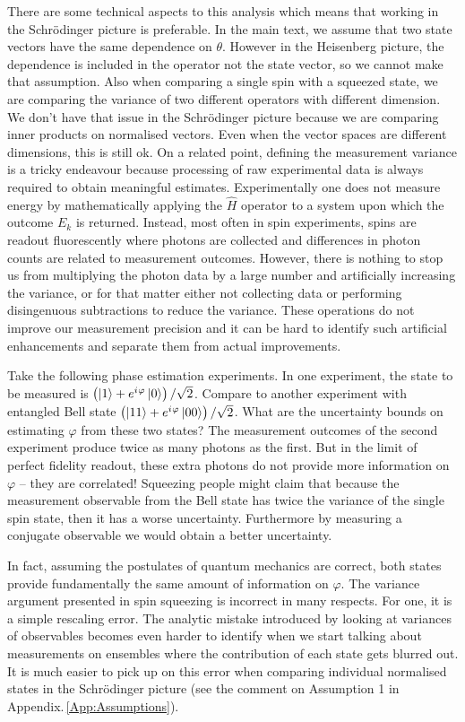 \documentclass[reqno]{amsart}
\newcommand{\ket}[1]{\left| #1 \right>}
\newcommand{\hham}{\hat{H}}
\newcommand{\iu}{{i\mkern1mu}}
\begin{document}
There are some technical aspects to this analysis which means that working in the Schr\"odinger picture is preferable. In the main text, we assume that two state vectors have the same dependence on $\theta$. However in the Heisenberg picture, the dependence is included in the operator not the state vector, so we cannot make that assumption. Also when comparing a single spin with a squeezed state, we are comparing the variance of two different operators with different dimension. We don't have that issue in the Schr\"odinger picture because we are comparing inner products on normalised vectors. Even when the vector spaces are different dimensions, this is still ok. On a related point, defining the measurement variance is a tricky endeavour because processing of raw experimental data is always required to obtain meaningful estimates. Experimentally one does not measure energy by mathematically applying the $\hham$ operator to a system upon which the outcome $E_k$ is returned. Instead, most often in spin experiments, spins are readout fluorescently where photons are collected and differences in photon counts are related to measurement outcomes. However, there is nothing to stop us from multiplying the photon data by a large number and artificially increasing the variance, or for that matter either not collecting data or performing disingenuous subtractions to reduce the variance. These operations do not improve our measurement precision and it can be hard to identify such artificial enhancements and separate them from actual improvements. 

Take the following phase estimation experiments. In one experiment, the state to be measured is $\left(\ket{1} + e^{\iu \varphi}\ket{0}\right)/\sqrt{2}$. Compare to another experiment with entangled Bell state $\left(\ket{1 1}+ e^{\iu \varphi}\ket{0 0}\right)/\sqrt{2}$. What are the uncertainty bounds on estimating $\varphi$ from these two states? The measurement outcomes of the second experiment produce twice as many photons as the first. But in the limit of perfect fidelity readout, these extra photons do not provide more information on $\varphi$ -- they are correlated! Squeezing people might claim that because the measurement observable from the Bell state has twice the variance of the single spin state, then it has a worse uncertainty. Furthermore by measuring a conjugate observable we would obtain a better uncertainty.

In fact, assuming the postulates of quantum mechanics are correct, both states provide fundamentally the same amount of information on $\varphi$. The variance argument presented in spin squeezing is incorrect in many respects. For one, it is a simple rescaling error. The analytic mistake introduced by looking at variances of observables becomes even harder to identify when we start talking about measurements on ensembles where the contribution of each state gets blurred out. It is much easier to pick up on this error when comparing individual normalised states in the Schr\"odinger picture (see the comment on Assumption 1 in Appendix.\,\ref{App:Assumptions}). 
\\
\end{document}
